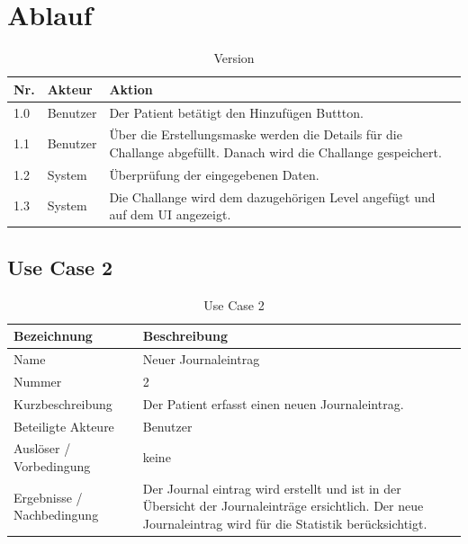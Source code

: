 \section{Ablauf}
\begin{table}[H]
 \caption{Version}
 \begin{tabularx}{\textwidth}{|l|l|X|}
     \hline
     \textbf{Nr.} & \textbf{Akteur} & \textbf{Aktion} \\
     \hline
     1.0          & Benutzer        & Der Patient bet\"{a}tigt den Hinzuf\"{u}gen Buttton. \\
     \hline
     1.1          & Benutzer        & \"{U}ber die Erstellungsmaske werden die Details f\"{u}r die Challange abgef\"{u}llt. Danach wird die Challange gespeichert. \\
     \hline
     1.2          & System          & \"{U}berpr\"{u}fung der eingegebenen Daten.  \\
     \hline
     1.3          & System          & Die Challange wird dem dazugeh\"{o}rigen Level angef\"{u}gt und auf dem UI angezeigt. \\
     \hline
 \end{tabularx}
 \label{table: Version}
\end{table}

\subsection{Use Case 2}
\begin{table}[H]
 \caption{Use Case 2}
 \begin{tabularx}{\textwidth}{|l|X|}
     \hline
     \textbf{Bezeichnung}       & \textbf{Beschreibung} \\
     \hline
     Name                       & Neuer Journaleintrag \\
     \hline
     Nummer                     & 2 \\
     \hline
     Kurzbeschreibung           & Der Patient erfasst einen neuen Journaleintrag. \\
     \hline
     Beteiligte Akteure         & Benutzer \\
     \hline
     Ausl\"{o}ser / Vorbedingung    & keine \\
     \hline
     Ergebnisse / Nachbedingung & Der Journal eintrag wird erstellt und ist in der \"{U}bersicht der Journaleintr\"{a}ge ersichtlich. Der neue Journaleintrag wird f\"{u}r die Statistik ber\"{u}cksichtigt. \\
     \hline
 \end{tabularx}
 \label{table: Use Case 2}
\end{table}

